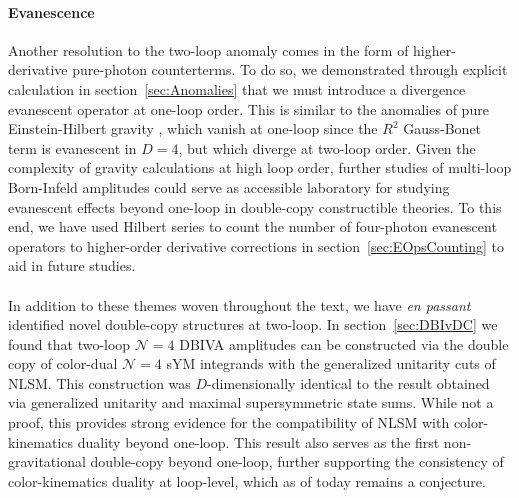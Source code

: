 \documentclass[12pt,letter]{article}
\def\sect#1{section~\ref{#1}}
\begin{document}
\paragraph{\textbf{Evanescence}}Another resolution to the two-loop anomaly comes in the form of higher-derivative pure-photon counterterms. To do so, we demonstrated through explicit calculation in \sect{sec:Anomalies} that we must introduce a divergence evanescent operator at one-loop order. This is similar to the anomalies of pure Einstein-Hilbert gravity \cite{Duff:1980qv,Bern:2017puu}, which vanish at one-loop since the $R^2$ Gauss-Bonet term is evanescent in $D=4$, but which diverge at two-loop order. Given the complexity of gravity calculations at high loop order, further studies of multi-loop Born-Infeld amplitudes could serve as accessible laboratory for studying evanescent effects beyond one-loop in double-copy constructible theories. To this end, we have used Hilbert series to count the number of four-photon evanescent operators to higher-order derivative corrections in \sect{sec:EOpsCounting} to aid in future studies. 

\paragraph{} In addition to these themes woven throughout the text, we have \textit{en passant} identified novel double-copy structures at two-loop. In \sect{sec:DBIvDC} we found that two-loop $\mathcal{N}=4$ DBIVA amplitudes can be constructed via the double copy of color-dual $\mathcal{N}=4$ sYM integrands with the generalized unitarity cuts of NLSM. This construction was $D$-dimensionally identical to the result obtained via generalized unitarity and maximal supersymmetric state sums. While not a proof, this provides strong evidence for the compatibility of NLSM with color-kinematics duality beyond one-loop. This result also serves as the first non-gravitational double-copy beyond one-loop, further supporting the consistency of color-kinematics duality at loop-level, which as of today remains a conjecture. 
\end{document}
